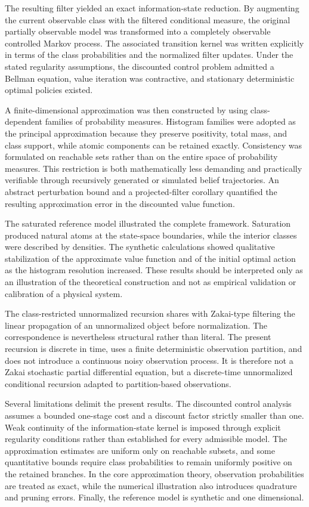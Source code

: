 \documentclass[10pt,twocolumn]{article}
\theoremstyle{remark}
\begin{document}
The resulting filter yielded an exact information-state reduction. By augmenting the current observable class with the filtered conditional measure, the original partially observable model was transformed into a completely observable controlled Markov process. The associated transition kernel was written explicitly in terms of the class probabilities and the normalized filter updates. Under the stated regularity assumptions, the discounted control problem admitted a Bellman equation, value iteration was contractive, and stationary deterministic optimal policies existed.

A finite-dimensional approximation was then constructed by using class-dependent families of probability measures. Histogram families were adopted as the principal approximation because they preserve positivity, total mass, and class support, while atomic components can be retained exactly. Consistency was formulated on reachable sets rather than on the entire space of probability measures. This restriction is both mathematically less demanding and practically verifiable through recursively generated or simulated belief trajectories. An abstract perturbation bound and a projected-filter corollary quantified the resulting approximation error in the discounted value function.

The saturated reference model illustrated the complete framework. Saturation produced natural atoms at the state-space boundaries, while the interior classes were described by densities. The synthetic calculations showed qualitative stabilization of the approximate value function and of the initial optimal action as the histogram resolution increased. These results should be interpreted only as an illustration of the theoretical construction and not as empirical validation or calibration of a physical system.

The class-restricted unnormalized recursion shares with Zakai-type filtering the linear propagation of an unnormalized object before normalization. The correspondence is nevertheless structural rather than literal. The present recursion is discrete in time, uses a finite deterministic observation partition, and does not introduce a continuous noisy observation process. It is therefore not a Zakai stochastic partial differential equation, but a discrete-time unnormalized conditional recursion adapted to partition-based observations.

Several limitations delimit the present results. The discounted control analysis assumes a bounded one-stage cost and a discount factor strictly smaller than one. Weak continuity of the information-state kernel is imposed through explicit regularity conditions rather than established for every admissible model. The approximation estimates are uniform only on reachable subsets, and some quantitative bounds require class probabilities to remain uniformly positive on the retained branches. In the core approximation theory, observation probabilities are treated as exact, while the numerical illustration also introduces quadrature and pruning errors. Finally, the reference model is synthetic and one dimensional.
\end{document}
